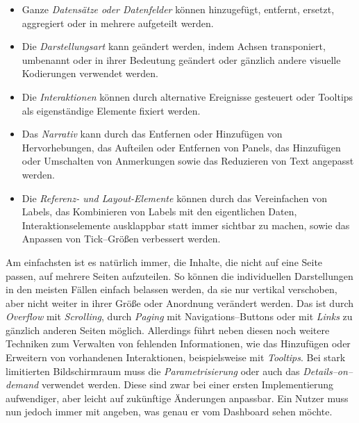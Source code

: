 \begin{itemize}
    \item Ganze \emph{Datensätze oder Datenfelder} können hinzugefügt, entfernt, ersetzt, aggregiert oder in mehrere aufgeteilt werden.
    \item Die \emph{Darstellungsart} kann geändert werden, indem Achsen transponiert, umbenannt oder in ihrer Bedeutung geändert oder gänzlich andere visuelle Kodierungen verwendet werden.
    \item Die \emph{Interaktionen} können durch alternative Ereignisse gesteuert oder Tooltips als eigenständige Elemente fixiert werden.
    \item Das \emph{Narrativ} kann durch das Entfernen oder Hinzufügen von Hervorhebungen, das Aufteilen oder Entfernen von Panels, das Hinzufügen oder Umschalten von Anmerkungen sowie das Reduzieren von Text angepasst werden.
    \item Die \emph{Referenz- und Layout-Elemente} können durch das Vereinfachen von Labels, das Kombinieren von Labels mit den eigentlichen Daten, Interaktionselemente ausklappbar statt immer sichtbar zu machen, sowie das Anpassen von Tick--Größen verbessert werden.
\end{itemize}

Am einfachsten ist es natürlich immer, die Inhalte, die nicht auf eine Seite passen, auf mehrere Seiten aufzuteilen.
So können die individuellen Darstellungen in den meisten Fällen einfach belassen werden, da sie nur vertikal verschoben, aber nicht weiter in ihrer Größe oder Anordnung verändert werden.
Das ist durch \emph{Overflow} mit \emph{Scrolling}, durch \emph{Paging} mit Navigations--Buttons oder mit \emph{Links} zu gänzlich anderen Seiten möglich.
Allerdings führt \autocite[S. 6--7]{Bach.DashboardDesignPatterns.2023} neben diesen noch weitere Techniken zum Verwalten von fehlenden Informationen, wie das Hinzufügen oder Erweitern von vorhandenen Interaktionen, beispielsweise mit \emph{Tooltips}.
Bei stark limitierten Bildschirmraum muss die \emph{Parametrisierung} oder auch das \emph{Details--on--demand} verwendet werden.
Diese sind zwar bei einer ersten Implementierung aufwendiger, aber leicht auf zukünftige Änderungen anpassbar.
Ein Nutzer muss nun jedoch immer mit angeben, was genau er vom Dashboard sehen möchte.

